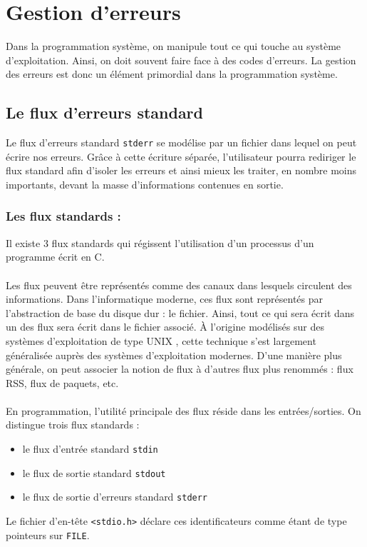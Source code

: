 \section{Gestion d'erreurs}

	Dans la programmation système, on manipule tout ce qui touche au système d'exploitation. Ainsi, on doit souvent faire face à des codes d'erreurs. La gestion des erreurs est donc un élément primordial dans la programmation système.
	
	\subsection{Le flux d'erreurs standard}
		Le flux d'erreurs standard \lstinline!stderr! se modélise par un fichier dans lequel on peut écrire nos erreurs. Grâce à cette écriture séparée, l'utilisateur pourra rediriger le flux standard afin d'isoler les erreurs et ainsi mieux les traiter, en nombre moins importants, devant la masse d'informations contenues en sortie. 
		
		\subsubsection*{Les flux standards :}
			Il existe 3 flux standards qui régissent l'utilisation d'un processus d'un programme écrit en C.
			
			\paragraph{} Les flux peuvent être représentés comme des canaux dans lesquels circulent des informations. Dans l'informatique moderne, ces flux sont représentés par l'abstraction de base du disque dur : le fichier. Ainsi, tout ce qui sera écrit dans un des flux sera écrit dans le fichier associé. À l'origine modélisés sur des systèmes d'exploitation de type UNIX , cette technique s'est largement généralisée auprès des systèmes d'exploitation modernes. D'une manière plus générale, on peut associer la notion de flux à d'autres flux plus renommés : flux RSS, flux de paquets, etc.
			
			\paragraph{} En programmation, l'utilité principale des flux réside dans les entrées/sorties. On distingue trois flux standards : 
			\begin{itemize}
				\item le flux d'entrée standard \lstinline!stdin!
				\item le flux de sortie standard \lstinline!stdout!
				\item le flux de sortie d'erreurs standard \lstinline!stderr!
			\end{itemize}
			Le fichier d'en-tête \lstinline!<stdio.h>! déclare ces identificateurs comme étant de type pointeurs sur \lstinline!FILE!.
			
